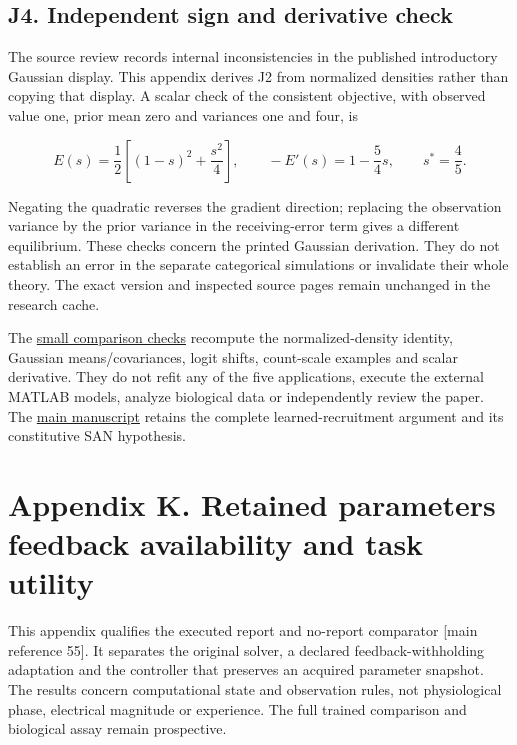 \documentclass[
  american,
  11pt,
  letterpaper,
]{article}
\begin{document}
\subsection{J4. Independent sign and derivative check}\label{j4.-independent-sign-and-derivative-check}

The source review records internal inconsistencies in the published introductory Gaussian display. This appendix derives J2 from normalized densities rather than copying that display. A scalar check of the consistent objective, with observed value one, prior mean zero and variances one and four, is

\begin{equation}
E(s)=\frac12\left[(1-s)^2+\frac{s^2}{4}\right],\qquad
-E'(s)=1-\frac54s,\qquad s^*=\frac45.
\tag{J8}
\end{equation}

Negating the quadratic reverses the gradient direction; replacing the observation variance by the prior variance in the receiving-error term gives a different equilibrium. These checks concern the printed Gaussian derivation. They do not establish an error in the separate categorical simulations or invalidate their whole theory. The exact version and inspected source pages remain unchanged in the research cache.

The \href{https://github.com/v5ma/v5ma.github.io/blob/master/papers/companions/learning-to-feel-v1.0/ARTIFACT-AVAILABILITY.md#artifact-33}{small comparison checks} recompute the normalized-density identity, Gaussian means/covariances, logit shifts, count-scale examples and scalar derivative. They do not refit any of the five applications, execute the external MATLAB models, analyze biological data or independently review the paper. The \href{https://raw.githubusercontent.com/v5ma/v5ma.github.io/master/papers/companions/learning-to-feel-v1.0/Learning-to-Feel-v1.0.pdf}{main manuscript} retains the complete learned-recruitment argument and its constitutive SAN hypothesis.

\clearpage
\hypertarget{appendix-k}{}

\section{Appendix K. Retained parameters feedback availability and task utility}\label{appendix-k.-retained-parameters-feedback-availability-and-task-utility}

This appendix qualifies the executed report and no-report comparator {[}main reference 55{]}. It separates the original solver, a declared feedback-withholding adaptation and the controller that preserves an acquired parameter snapshot. The results concern computational state and observation rules, not physiological phase, electrical magnitude or experience. The full trained comparison and biological assay remain prospective.
\end{document}
